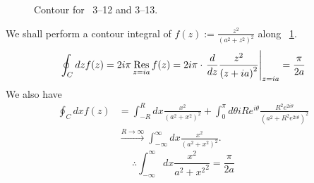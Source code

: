 \item

\begin{figure}[h]
	\centering
	\caption{Contour for ~3--12 and 3--13.}%
	\label{fig:problem3-12}
\end{figure}

We shall perform a contour integral of $f(z) := \frac{z^2}{{\left( a^2 + z^2 \right)}^2}$ along ~\ref{fig:problem3-12}.
\[
	\oint_C dz f(z)
	= 2i\pi \mathop{\mathrm{Res}}_{z = ia} f(z)
	= 2i\pi \cdot {\left. \frac{d}{dz} \frac{z^2}{{\left( z + ia \right)}^2} \right|}_{z = ia}
	= \frac{\pi}{2a}
\]
We also have
\begin{align*}
	\oint_C dx f(z)
	 & = \int_{-R}^{R} dx \frac{x^2}{{\left( a^2 + x^2 \right)}^2}
	+\int_0^{\pi} d\theta iRe^{i\theta} \frac{R^2 e^{2i\theta}}{{\left( a^2 + R^2 e^{2i\theta} \right)}^2}     \\
	 & \xrightarrow{R \rightarrow \infty} \int_{-\infty}^{\infty} dx \frac{x^2}{{\left( a^2 + x^2 \right)}^2}.
\end{align*}
\[
	\therefore \int_{-\infty}^{\infty} dx \frac{x^2}{{a^2 + x^2}^2} = \frac{\pi}{2a}
\]